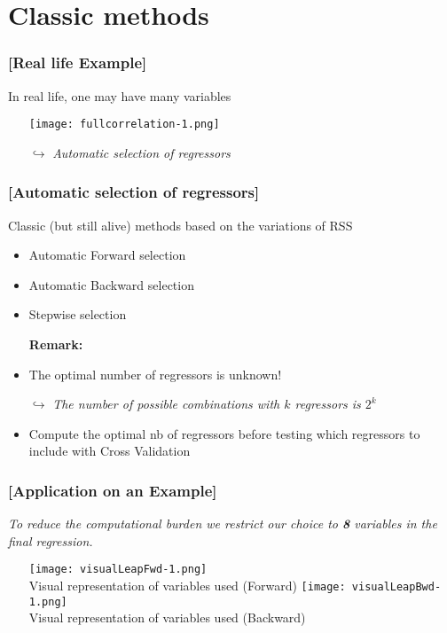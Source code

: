 \documentclass[xcolor=x11names,compress, handhouts]{beamer}
\renewcommand{\(}{\begin{columns}}
\renewcommand{\)}{\end{columns}}
\newcommand{\<}[1]{\begin{column}{#1}}
\renewcommand{\>}{\end{column}}
\begin{document}
\section{Classic methods}

\begin{frame} %
\frametitle{\textcolor{brique}{[Real life Example]}}
In real life, one may have many variables
\pause
\begin{itemize}[<+->]
  \item[] \texttt{[image: fullcorrelation-1.png]}
  \item[$\hookrightarrow$] \textit{Automatic selection of regressors }
\end{itemize}
\end{frame}

\begin{frame} %
\frametitle{\textcolor{brique}{[Automatic selection of regressors]}}
Classic (but still alive) methods based on the variations of RSS
\pause
\begin{itemize}[<+->]
  \item Automatic Forward selection
  \item Automatic Backward selection
  \item Stepwise selection
  \item[\textbf{Remark:}]
  \item The optimal number of regressors is unknown!
  \item[$\hookrightarrow$] \textit{The number of possible combinations with $k$ regressors is $2^k$ }
  \item Compute the optimal nb of regressors before testing which regressors to include with Cross Validation
\end{itemize}
\end{frame}

\begin{frame} %
\frametitle{\textcolor{brique}{[Application on an Example]}}
\emph{To reduce the computational burden we restrict our choice to \textbf{8} variables in the final regression.}
\pause
\begin{itemize}
  \item[]
   { \texttt{[image: visualLeapFwd-1.png]} \\ }
   {Visual representation of variables used (Forward) }
   {\texttt{[image: visualLeapBwd-1.png]} \\ }
   {Visual representation of variables used (Backward) }
\end{itemize}
\end{frame}
\end{document}
